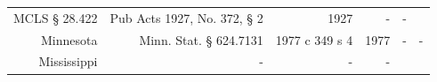 \documentclass[]{article}
\begin{document}
\begin{longtable}[c]{@{}rrrrrr@{}}
\begin{minipage}[t]{0.21\columnwidth}\raggedleft\strut
MCLS § 28.422
\strut\end{minipage} &
\begin{minipage}[t]{0.22\columnwidth}\raggedleft\strut
Pub Acts 1927, No. 372, § 2
\strut\end{minipage} &
\begin{minipage}[t]{0.10\columnwidth}\raggedleft\strut
1927
\strut\end{minipage} &
\begin{minipage}[t]{0.10\columnwidth}\raggedleft\strut
-
\strut\end{minipage} &
\begin{minipage}[t]{0.10\columnwidth}\raggedleft\strut
-
\strut\end{minipage}\tabularnewline
\begin{minipage}[t]{0.10\columnwidth}\raggedleft\strut
Minnesota
\strut\end{minipage} &
\begin{minipage}[t]{0.21\columnwidth}\raggedleft\strut
Minn. Stat. § 624.7131
\strut\end{minipage} &
\begin{minipage}[t]{0.22\columnwidth}\raggedleft\strut
1977 c 349 s 4
\strut\end{minipage} &
\begin{minipage}[t]{0.10\columnwidth}\raggedleft\strut
1977
\strut\end{minipage} &
\begin{minipage}[t]{0.10\columnwidth}\raggedleft\strut
-
\strut\end{minipage} &
\begin{minipage}[t]{0.10\columnwidth}\raggedleft\strut
-
\strut\end{minipage}\tabularnewline
\begin{minipage}[t]{0.10\columnwidth}\raggedleft\strut
Mississippi
\strut\end{minipage} &
\begin{minipage}[t]{0.21\columnwidth}\raggedleft\strut
-
\strut\end{minipage} &
\begin{minipage}[t]{0.22\columnwidth}\raggedleft\strut
-
\strut\end{minipage} &
\begin{minipage}[t]{0.10\columnwidth}\raggedleft\strut
-
\strut\end{minipage} &
\begin{minipage}[t]{0.10\columnwidth}\raggedleft\strut

\end{minipage}
\end{longtable}
\end{document}
